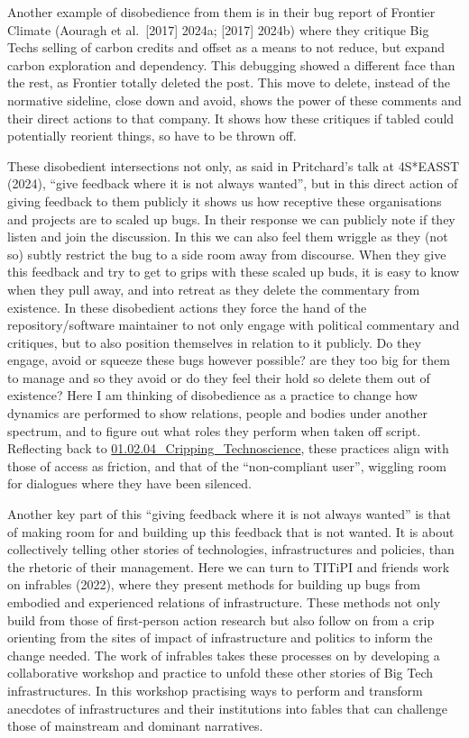 Another example of disobedience from them is in their bug report of
Frontier Climate (Aouragh et al.~{[}2017{]} 2024a; {[}2017{]} 2024b)
where they critique Big Techs selling of carbon credits and offset as a
means to not reduce, but expand carbon exploration and dependency. This
debugging showed a different face than the rest, as Frontier totally
deleted the post. This move to delete, instead of the normative
sideline, close down and avoid, shows the power of these comments and
their direct actions to that company. It shows how these critiques if
tabled could potentially reorient things, so have to be thrown off.

These disobedient intersections not only, as said in Pritchard's talk at
4S*EASST (2024), ``give feedback where it is not always wanted'', but in
this direct action of giving feedback to them publicly it shows us how
receptive these organisations and projects are to scaled up bugs. In
their response we can publicly note if they listen and join the
discussion. In this we can also feel them wriggle as they (not so)
subtly restrict the bug to a side room away from discourse. When they
give this feedback and try to get to grips with these scaled up buds, it
is easy to know when they pull away, and into retreat as they delete the
commentary from existence. In these disobedient actions they force the
hand of the repository/software maintainer to not only engage with
political commentary and critiques, but to also position themselves in
relation to it publicly. Do they engage, avoid or squeeze these bugs
however possible? are they too big for them to manage and so they avoid
or do they feel their hold so delete them out of existence? Here I am
thinking of disobedience as a practice to change how dynamics are
performed to show relations, people and bodies under another spectrum,
and to figure out what roles they perform when taken off script.
Reflecting back to
\href{../../01_Disability_justice_and_life_affirmation_flipping_the_table/sections/01.02.04_Cripping_Technoscience.md}{01.02.04\_Cripping\_Technoscience},
these practices align with those of access as friction, and that of the
``non-compliant user'', wiggling room for dialogues where they have been
silenced.

Another key part of this ``giving feedback where it is not always
wanted'' is that of making room for and building up this feedback that
is not wanted. It is about collectively telling other stories of
technologies, infrastructures and policies, than the rhetoric of their
management. Here we can turn to TITiPI and friends work on infrables
(2022), where they present methods for building up bugs from embodied
and experienced relations of infrastructure. These methods not only
build from those of first-person action research but also follow on from
a crip orienting from the sites of impact of infrastructure and politics
to inform the change needed. The work of infrables takes these processes
on by developing a collaborative workshop and practice to unfold these
other stories of Big Tech infrastructures. In this workshop practising
ways to perform and transform anecdotes of infrastructures and their
institutions into fables that can challenge those of mainstream and
dominant narratives.

